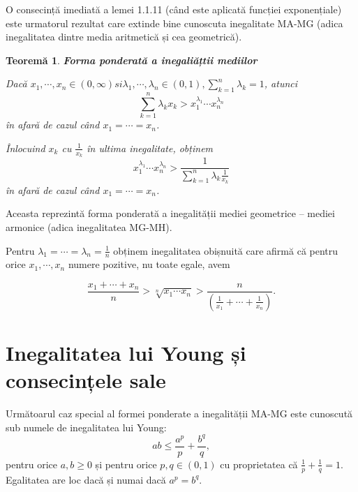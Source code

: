 \documentclass[a4paper,12pt,oneside]{report}
\newtheorem{theorem}{Teorem\u a}
\begin{document}
O consecință imediată a lemei 1.1.11 (când este aplicată funcției exponențiale) este urmatorul rezultat care extinde bine cunoscuta inegalitate MA-MG (adica inegalitatea dintre media aritmetică și cea geometrică).


\begin{theorem}
\textbf{Forma ponderată a inegaliățtii mediilor}

Dacă \(x_{1},\cdots,x_{n}\in \left ( 0,\infty  \right ) si \lambda_{1},\cdots,\lambda _{n} \in \left ( 0 , 1 \right ), \sum_{k = 1}^{n}\lambda _{k}= 1\), atunci
\begin{displaymath}
  \sum_{k = 1}^{n}\lambda _{k}x_{k}> x_{1}^{\lambda _{1}}\cdots x_{n}^{\lambda _{n}}
\end{displaymath}
în afară de cazul când \(x_{1} = \cdots = x_{n}\).
	
	Înlocuind \(x_{k}\) cu \(\frac{1}{x_{k} }\) în ultima inegalitate, obținem
\begin{displaymath}
  x_{1}^{\lambda _{1}}\cdots x_{n}^{\lambda _{n}}> \frac{1}{\sum_{k = 1}^{n}\lambda _{k}\frac{1}{x_{k}}}
\end{displaymath}
în afară de cazul când \(x_{1} = \cdots = x_{n}\).
\end{theorem}
Aceasta reprezintă forma ponderată a inegalității mediei geometrice – mediei armonice (adica inegalitatea MG-MH).

Pentru \(\lambda _{1} = \cdots =\lambda _{n}= \frac{1}{n}\) obținem inegalitatea obișnuită care afirmă că pentru orice \(x_{1},\cdots,x_{n}\)  numere pozitive, nu toate egale, avem

\begin{displaymath}
  \frac{x_{1}+\cdots+x_{n}}{n}> \sqrt[n]{x_{1}\cdots x_{n}}> \frac{n}{\left ( \frac{1}{x_{1}}+\cdots+\frac{1}{x_{n}} \right )}.
\end{displaymath}




\section{Inegalitatea lui Young și consecințele sale}

Următoarul caz special al formei ponderate a inegalității MA-MG este cunoscută sub numele de inegalitatea lui Young:
\begin{displaymath}
  ab \leq \frac{a^{p}}{p}+ \frac{b^{q}}{q},
\end{displaymath}
pentru orice \(a,b \geq 0\)
și pentru orice  \(p,q \in \left ( 0 , 1 \right )\) cu proprietatea că \(\frac{1}{p}+\frac{1}{q} = 1\).
Egalitatea are loc dacă și numai dacă \(a^{p}= b^{q}\).
\end{document}

